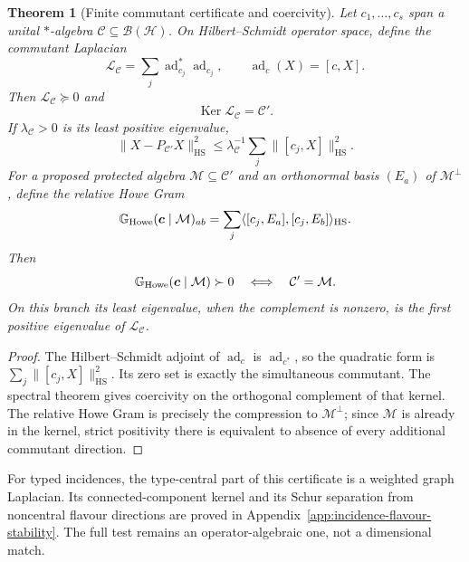 \documentclass[11pt]{article}
\numberwithin{equation}{section}
\newtheorem{theorem}{Theorem}[section]
\theoremstyle{definition}
\theoremstyle{remark}
\newcommand{\Ker}{\operatorname{Ker}}
\newcommand{\HS}{\mathrm{HS}}
\newcommand{\Hh}{\mathcal H}
\newcommand{\M}{\mathcal M}
\begin{document}
\begin{theorem}[Finite commutant certificate and coercivity]
\label{thm:howe-certificate}
Let $c_1,\ldots,c_s$ span a unital $*$-algebra
$\mathcal C\subseteq\mathcal B(\Hh)$.  On Hilbert--Schmidt operator space,
define the commutant Laplacian
\begin{equation}
 \mathscr L_{\mathcal C}=\sum_j\operatorname{ad}_{c_j}^*
                         \operatorname{ad}_{c_j},\qquad
 \operatorname{ad}_c(X)=[c,X].
 \label{eq:commutant-laplacian}
\end{equation}
Then $\mathscr L_{\mathcal C}\succeq0$ and
\begin{equation}
 \Ker\mathscr L_{\mathcal C}=\mathcal C'.
 \label{eq:commutant-kernel}
\end{equation}
If $\lambda_{\mathcal C}>0$ is its least positive eigenvalue,
\begin{equation}
 \|X-P_{\mathcal C'}X\|_{\HS}^2
 \le\lambda_{\mathcal C}^{-1}\sum_j\|[c_j,X]\|_{\HS}^2.
 \label{eq:commutant-coercivity}
\end{equation}
For a proposed protected algebra $\M\subseteq\mathcal C'$ and an
orthonormal basis $(E_a)$ of $\M^\perp$, define the relative Howe Gram
\begin{equation}
 \mathbb G_{\rm Howe}(\bm c\mid\M)_{ab}
   =\sum_j\langle[c_j,E_a],[c_j,E_b]\rangle_{\HS}.
 \label{eq:howe-gram}
\end{equation}
Then
\begin{equation}
 \mathbb G_{\rm Howe}(\bm c\mid\M)\succ0
 \quad\Longleftrightarrow\quad\mathcal C'=\M.
 \label{eq:howe-certificate}
\end{equation}
On this branch its least eigenvalue, when the complement is nonzero, is the
first positive eigenvalue of $\mathscr L_{\mathcal C}$.
\end{theorem}
\begin{proof}
The Hilbert--Schmidt adjoint of $\operatorname{ad}_c$ is
$\operatorname{ad}_{c^*}$, so the quadratic form is
$\sum_j\|[c_j,X]\|_{\HS}^2$.  Its zero set is exactly the simultaneous
commutant.  The spectral theorem gives coercivity on the orthogonal
complement of that kernel.  The relative Howe Gram is precisely the
compression to $\M^\perp$; since $\M$ is already in the kernel, strict
positivity there is equivalent to absence of every additional commutant
direction.
\end{proof}

For typed incidences, the type-central part of this certificate is a weighted
graph Laplacian.  Its connected-component kernel and its Schur separation
from noncentral flavour directions are proved in
Appendix~\ref{app:incidence-flavour-stability}.  The full test remains an
operator-algebraic one, not a dimensional match.
\end{document}
